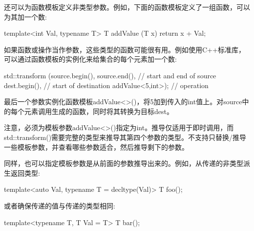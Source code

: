 还可以为函数模板定义非类型参数。例如，下面的函数模板定义了一组函数，可以为其加一个数:

\begin{cpp}
template<int Val, typename T>
T addValue (T x)
{
	return x + Val;
}
\end{cpp}

如果函数或操作当作参数，这些类型的函数可能很有用。例如使用C++标准库，可以通过函数模板的实例化来给集合的每个元素加一个数:

\begin{cpp}
std::transform (source.begin(), source.end(), // start and end of source
dest.begin(), // start of destination
addValue<5,int>); // operation
\end{cpp}

最后一个参数实例化函数模板addValue<>()，将5加到传入的int值上。对source中的每个元素调用生成的函数，同时将其转换为目标dest。

注意，必须为模板参数addValue<>()指定为int。推导仅适用于即时调用，而std::transform()需要完整的类型来推导其第四个参数的类型。不支持只替换/推导一些模板参数，并查看哪些参数适合，然后推导剩下的参数。

同样，也可以指定模板参数是从前面的参数推导出来的。例如，从传递的非类型派生返回类型:

\begin{cpp}
template<auto Val, typename T = decltype(Val)>
T foo();
\end{cpp}

或者确保传递的值与传递的类型相同:

\begin{cpp}
template<typename T, T Val = T{}>
T bar();
\end{cpp}
































